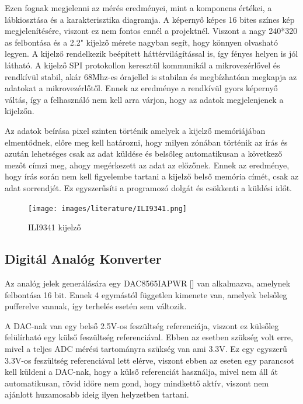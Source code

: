 Ezen fognak megjelenni az mérés eredményei, mint a komponens értékei, a lábkiosztása
és a karakterisztika diagramja. A képernyő képes 16 bites színes kép megjelenítésére,
viszont ez nem fontos ennél a projektnél. Viszont a nagy 240*320 as felbontása és
a 2.2" kijelző mérete nagyban segít, hogy könnyen olvasható legyen. A kijelző rendelkezik
beépített háttérvilágítással is, így fényes helyen is jól látható.
A kijelző SPI protokollon keresztül kommunikál a mikrovezérlővel és rendkívül stabil,
akár 68Mhz-es órajellel is stabilan és megbízhatóan megkapja az adatokat a mikrovezérlőtől.
Ennek az eredménye a rendkívül gyors képernyő váltás, így a felhasználó nem kell
arra várjon, hogy az adatok megjelenjenek a kijelzőn.

Az adatok beírása pixel szinten történik amelyek a kijelző memóriájában elmentődnek, 
előre meg kell határozni, hogy milyen
zónában történik az írás és azután lehetséges csak az adat küldése és belsőleg automatikusan
a következő mezőt címzi meg, ahogy megérkezett az adat az előzőnek. Ennek az eredménye,
hogy írás során nem kell figyelembe tartani a kijelző belső memória címét, csak az 
adat sorrendjét. Ez egyszerűsíti a programozó dolgát és csökkenti a küldési
időt.

\begin{figure}[H]
    \centering
    \texttt{[image: images/literature/ILI9341.png]}
    \caption{ILI9341 kijelző}
    \label{fig:ILI9341 kijelző}
\end{figure}

\subsection{Digitál Analóg Konverter}

Az analóg jelek generálására egy DAC8565IAPWR [\cite{DAC}] van alkalmazva, 
amelynek felbontása 16 bit.
Ennek 4 egymástól független kimenete van, amelyek belsőleg pufferelve vannak,
így terhelés esetén sem változik. 

A DAC-nak van egy belső 2.5V-os feszültség referenciája,
viszont ez külsőleg felülírható egy külső feszültség referenciával. Ebben az 
esetben szükség volt erre, mivel a teljes ADC mérési tartományra szükség van
ami 3.3V. Ez egy egyszerű 3.3V-os feszültség referenciával lett elérve, viszont
ebben az eseten egy parancsot kell küldeni a DAC-nak, hogy a külső referenciát használja,
mivel nem áll át automatikusan, rövid időre nem gond, hogy mindkettő aktív, viszont
nem ajánlott huzamosabb ideig ilyen helyzetben tartani.

